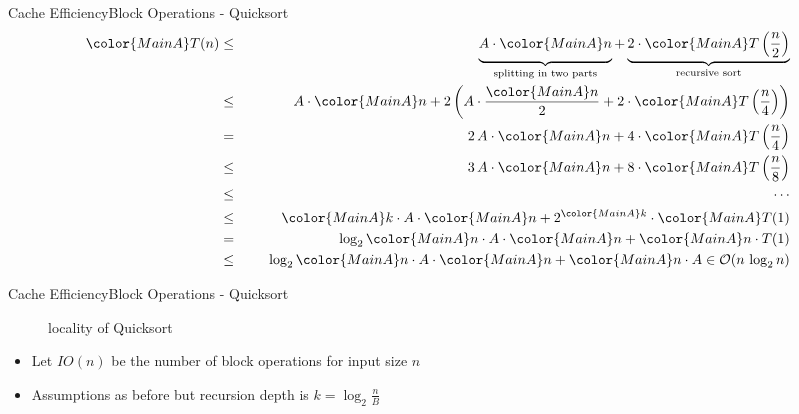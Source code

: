 \begin{frame}{Cache Efficiency}{Block Operations - Quicksort}
  \begin{eqnarray*}
    {\color{MainA}T(n)} &\leq\hspace{1.5em}&
      \underbrace{
        A \cdot {\color{MainA}n}
        \vphantom{\frac{n}{2}}
      }_{\text{splitting in two parts}}
      +
      \underbrace{
        2 \cdot {\color{MainA}T\left(\frac{n}{2}\right)}
      }_{\text{recursive sort}}\\
    {} &\leq&
      A \cdot {\color{MainA}n} + 2 \left(
        A \cdot \frac{\color{MainA}n}{2}
        + 2 \cdot {\color{MainA}T\left(\frac{n}{4}\right)}
      \right)\\
    {} &=&
      2\,A \cdot {\color{MainA}n}
      + 4 \cdot {\color{MainA}T\left(\frac{n}{4}\right)}\\
    {} &\leq&
      3\,A \cdot {\color{MainA}n}
      + 8 \cdot {\color{MainA}T\left(\frac{n}{8}\right)}\\
    {} &\leq&\hspace{1.5em}\cdots\\
    {} &\leq&
      {\color{MainA}k} \cdot A \cdot {\color{MainA}n}
      + 2^{\color{MainA}k}
      \cdot {\color{MainA}T(1)}\\
    {} &=&
      \log_2 {\color{MainA}n} \cdot A \cdot {\color{MainA}n}
      + {\color{MainA}n \cdot T(1)}\\
    {} &\leq&
      \log_2 {\color{MainA}n} \cdot A \cdot {\color{MainA}n}
      + {\color{MainA}n} \cdot A
      \in \mathcal{O}(n \, \log_2 n)
  \end{eqnarray*}
\end{frame}


\begin{frame}{Cache Efficiency}{Block Operations - Quicksort}
  \begin{figure}%
    \begin{adjustbox}{width=\linewidth}%
    \end{adjustbox}%
    \caption{locality of Quicksort}
    \label{fig:caching:memory_locality_quicksort}
  \end{figure}%
  \begin{itemize}
    \item<2->
      Let {\color{MainA}$IO(n)$} be the number of
      {\color{MainA}block operations} for input size {\color{MainA}$n$}
    \item<3->
      Assumptions as before but recursion depth is
      {\color{MainA}$k = \log_2 \frac{n}{B}$}
  \end{itemize}
\end{frame}

